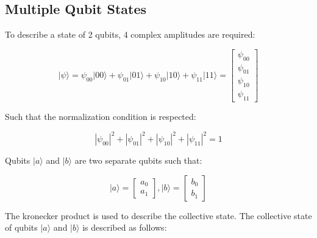 \subsection{Multiple Qubit States}
\label{sec:multq}

To describe a state of 2 qubits, 4 complex amplitudes are required:

\begin{linenomath}
\begin{equation}
\vert \psi \rangle = \psi_{00}\vert 00 \rangle + \psi_{01}\vert 01 \rangle + \psi_{10}\vert 10 \rangle + \psi_{11}\vert 11 \rangle = \begin{bmatrix} \psi_{00} \\ \psi_{01} \\ \psi_{10} \\ \psi_{11} \end{bmatrix}
\label{eq:multiq}
\end{equation}
\end{linenomath}

Such that the normalization condition is respected:

\begin{linenomath}
\begin{equation}
	|\psi_{00}|^2 + |\psi_{01}|^2 + |\psi_{10}|^2 + |\psi_{11}|^2 = 1
\label{eq:multinorm}
\end{equation}
\end{linenomath}

Qubits $\vert a \rangle$ and $\vert b \rangle$ are two separate qubits such that:

\begin{linenomath}
\begin{equation}
	\vert a \rangle = \begin{bmatrix} a_0 \\ a_1 \end{bmatrix}, \vert b \rangle = \begin{bmatrix} b_0 \\ b_1 \end{bmatrix}
\label{eq:ab}
\end{equation}
\end{linenomath}

The kronecker product is used to describe the collective state. The collective 
state of qubits $\vert a \rangle$ and $\vert b \rangle$ is described as follows:

